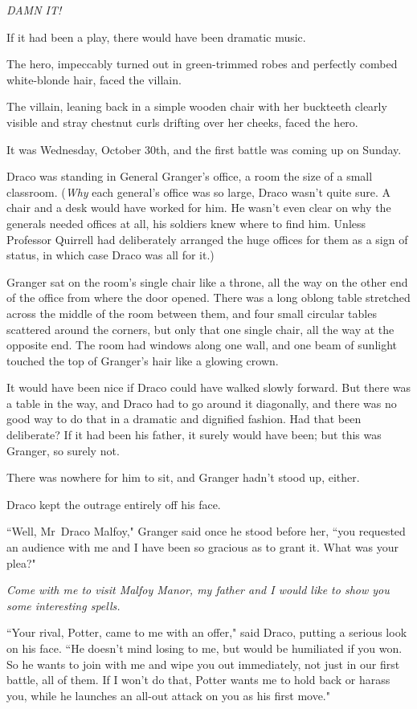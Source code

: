 \emph{DAMN IT!}

\later

If it had been a play, there would have been dramatic music.

The hero, impeccably turned out in green-trimmed robes and perfectly combed white-blonde hair, faced the villain.

The villain, leaning back in a simple wooden chair with her buckteeth clearly visible and stray chestnut curls drifting over her cheeks, faced the hero.

It was Wednesday, October 30th, and the first battle was coming up on Sunday.

Draco was standing in General Granger's office, a room the size of a small classroom. (\emph{Why} each general's office was so large, Draco wasn't quite sure. A chair and a desk would have worked for him. He wasn't even clear on why the generals needed offices at all, his soldiers knew where to find him. Unless Professor Quirrell had deliberately arranged the huge offices for them as a sign of status, in which case Draco was all for it.)

Granger sat on the room's single chair like a throne, all the way on the other end of the office from where the door opened. There was a long oblong table stretched across the middle of the room between them, and four small circular tables scattered around the corners, but only that one single chair, all the way at the opposite end. The room had windows along one wall, and one beam of sunlight touched the top of Granger's hair like a glowing crown.

It would have been nice if Draco could have walked slowly forward. But there was a table in the way, and Draco had to go around it diagonally, and there was no good way to do that in a dramatic and dignified fashion. Had that been deliberate? If it had been his father, it surely would have been; but this was Granger, so surely not.

There was nowhere for him to sit, and Granger hadn't stood up, either.

Draco kept the outrage entirely off his face.

``Well, Mr~Draco Malfoy," Granger said once he stood before her, ``you requested an audience with me and I have been so gracious as to grant it. What was your plea?"

\emph{Come with me to visit Malfoy Manor, my father and I would like to show you some interesting spells.}

``Your rival, Potter, came to me with an offer," said Draco, putting a serious look on his face. ``He doesn't mind losing to me, but would be humiliated if you won. So he wants to join with me and wipe you out immediately, not just in our first battle, all of them. If I won't do that, Potter wants me to hold back or harass you, while he launches an all-out attack on you as his first move."

